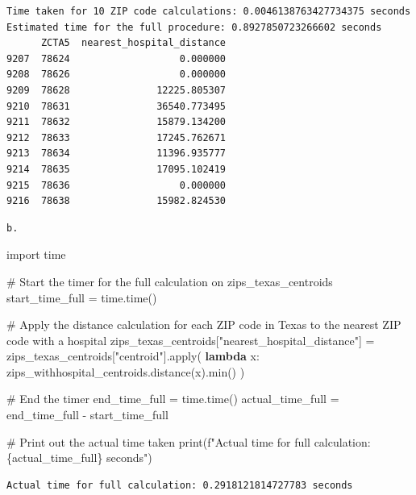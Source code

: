\documentclass[
  letterpaper,
  DIV=11,
  numbers=noendperiod]{scrartcl}
\newenvironment{Shaded}{\begin{snugshade}}{\end{snugshade}}
\newcommand{\BuiltInTok}[1]{\textcolor[rgb]{0.00,0.23,0.31}{#1}}
\newcommand{\CommentTok}[1]{\textcolor[rgb]{0.37,0.37,0.37}{#1}}
\newcommand{\ImportTok}[1]{\textcolor[rgb]{0.00,0.46,0.62}{#1}}
\newcommand{\KeywordTok}[1]{\textcolor[rgb]{0.00,0.23,0.31}{\textbf{#1}}}
\newcommand{\NormalTok}[1]{\textcolor[rgb]{0.00,0.23,0.31}{#1}}
\newcommand{\OperatorTok}[1]{\textcolor[rgb]{0.37,0.37,0.37}{#1}}
\newcommand{\SpecialCharTok}[1]{\textcolor[rgb]{0.37,0.37,0.37}{#1}}
\newcommand{\SpecialStringTok}[1]{\textcolor[rgb]{0.13,0.47,0.30}{#1}}
\newcommand{\StringTok}[1]{\textcolor[rgb]{0.13,0.47,0.30}{#1}}
\begin{document}
\begin{verbatim}
Time taken for 10 ZIP code calculations: 0.0046138763427734375 seconds
Estimated time for the full procedure: 0.8927850723266602 seconds
      ZCTA5  nearest_hospital_distance
9207  78624                   0.000000
9208  78626                   0.000000
9209  78628               12225.805307
9210  78631               36540.773495
9211  78632               15879.134200
9212  78633               17245.762671
9213  78634               11396.935777
9214  78635               17095.102419
9215  78636                   0.000000
9216  78638               15982.824530
\end{verbatim}

\begin{verbatim}
b.
\end{verbatim}

\begin{Shaded}
\begin{Highlighting}[]
\ImportTok{import}\NormalTok{ time}

\CommentTok{\# Start the timer for the full calculation on zips\_texas\_centroids}
\NormalTok{start\_time\_full }\OperatorTok{=}\NormalTok{ time.time()}

\CommentTok{\# Apply the distance calculation for each ZIP code in Texas to the nearest ZIP code with a hospital}
\NormalTok{zips\_texas\_centroids[}\StringTok{"nearest\_hospital\_distance"}\NormalTok{] }\OperatorTok{=}\NormalTok{ zips\_texas\_centroids[}\StringTok{"centroid"}\NormalTok{].}\BuiltInTok{apply}\NormalTok{(}
    \KeywordTok{lambda}\NormalTok{ x: zips\_withhospital\_centroids.distance(x).}\BuiltInTok{min}\NormalTok{()}
\NormalTok{)}

\CommentTok{\# End the timer}
\NormalTok{end\_time\_full }\OperatorTok{=}\NormalTok{ time.time()}
\NormalTok{actual\_time\_full }\OperatorTok{=}\NormalTok{ end\_time\_full }\OperatorTok{{-}}\NormalTok{ start\_time\_full}

\CommentTok{\# Print out the actual time taken}
\BuiltInTok{print}\NormalTok{(}\SpecialStringTok{f"Actual time for full calculation: }\SpecialCharTok{\{}\NormalTok{actual\_time\_full}\SpecialCharTok{\}}\SpecialStringTok{ seconds"}\NormalTok{)}
\end{Highlighting}
\end{Shaded}

\begin{verbatim}
Actual time for full calculation: 0.2918121814727783 seconds
\end{verbatim}
\end{document}
